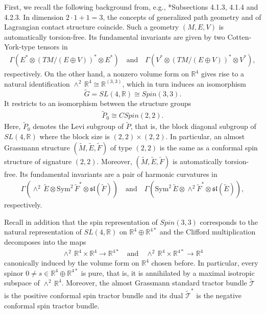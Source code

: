 \documentclass[11pt]{amsart}
\begin{document}
First, we recall the following background from, e.g., \cite{Book}*{Subsections 4.1.3, 4.1.4 and 4.2.3}. In dimension $2\cdot 1+1=3$, the concepts of generalized path geometry and of Lagrangian contact structure coincide. Such a geometry $(M,E,V)$ is automatically torsion-free. Its fundamental invariants are given by two Cotten-York-type tensors in
\begin{align}\label{Cotten-York}
    \Gamma(E^*\otimes(TM/(E\oplus V))^*\otimes E^*)\quad\text{and}\quad\Gamma(V^*\otimes(TM/(E\oplus V))^*\otimes V^*),
\end{align}
respectively. On the other hand, a nonzero volume form on $\mathbb R^4$ gives rise to a natural identification $\wedge^2\,\mathbb R^4\cong\mathbb R^{(3,3)}$, which in turn induces an isomorphism
\[\tilde G=SL(4,\mathbb R)\cong Spin(3,3).\]
It restricts to an isomorphism between the structure groups
\begin{align*}
\tilde P_0\cong CSpin(2,2).
\end{align*}
Here, $\tilde P_0$ denotes the Levi subgroup of $\tilde P$, that is, the block diagonal subgroup of $SL(4,\mathbb R)$ where the block size is $(2,2)\times (2,2)$. In particular, an almost Grassmann structure $(\tilde M,\tilde E,\tilde F)$ of type $(2,2)$ is the same as a conformal spin structure of signature $(2,2)$. Moreover, $(\tilde M,\tilde E,\tilde F)$ is automatically torsion-free. Its fundamental invariants are a pair of harmonic curvatures in
\begin{align*}
    \Gamma(\wedge^2\,\tilde E\otimes \mathrm{Sym}^2\,\tilde F^*\otimes\mathfrak{sl}(\tilde F))\quad\text{and}\quad\Gamma(\mathrm{Sym}^2\,\tilde E\otimes \wedge^2 \tilde F^*\otimes\mathfrak{sl}(\tilde E)),
\end{align*}
respectively.

Recall in addition that the spin representation of $Spin(3,3)$ corresponds to the natural representation of $SL(4,\mathbb R)$ on $\mathbb R^4\oplus\mathbb R^{4*}$ and the Clifford multiplication decomposes into the maps
\begin{align*}
    \wedge^2\,\mathbb R^4\times\mathbb R^4\to\mathbb R^{4*}
    \quad\text{and}\quad
    \wedge^2\,\mathbb R^4\times\mathbb R^{4*}\to\mathbb R^4
\end{align*}
canonically induced by the volume form on $\mathbb R^4$ chosen before. In particular, every spinor $0\neq s\in\mathbb R^4\oplus\mathbb R^{4*}$ is pure, that is, it is annihilated by a maximal isotropic subspace of $\wedge^2\,\mathbb R^4$. Moreover, the almost Grassmann standard tractor bundle $\tilde{\mathcal T}$ is the positive conformal spin tractor bundle and its dual $\tilde{\mathcal T}^*$ is the negative conformal spin tractor bundle.
\end{document}
